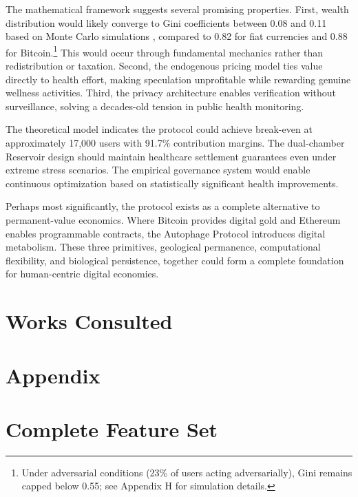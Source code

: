 \documentclass[11pt,letterpaper]{article}
\begin{document}
The mathematical framework suggests several promising properties. First, wealth distribution would likely converge to Gini coefficients \cite{gini1921measurement} between 0.08 and 0.11 based on Monte Carlo simulations \cite{statusdothealth2025gini}, compared to 0.82 for fiat currencies and 0.88 for Bitcoin.\footnote{Under adversarial conditions (23\% of users acting adversarially), Gini remains capped below 0.55; see Appendix H for simulation details.} This would occur through fundamental mechanics rather than redistribution or taxation. Second, the endogenous pricing model ties value directly to health effort, making speculation unprofitable while rewarding genuine wellness activities. Third, the privacy architecture enables verification without surveillance, solving a decades-old tension in public health monitoring.

The theoretical model indicates the protocol could achieve break-even at approximately 17,000 users with 91.7\% contribution margins. The dual-chamber Reservoir design should maintain healthcare settlement guarantees even under extreme stress scenarios. The empirical governance system would enable continuous optimization based on statistically significant health improvements.

Perhaps most significantly, the protocol exists as a complete alternative to permanent-value economics. Where Bitcoin \cite{nakamoto2008bitcoin} provides digital gold and Ethereum \cite{buterin2014ethereum} enables programmable contracts, the Autophage Protocol introduces digital metabolism. These three primitives, geological permanence, computational flexibility, and biological persistence, together could form a complete foundation for human-centric digital economies.

\section{Works Consulted}



\clearpage

\section{Appendix}
\appendix

\section{Complete Feature Set}
\end{document}
